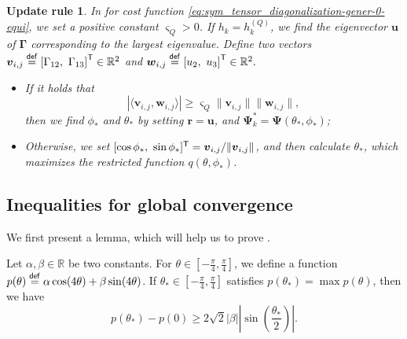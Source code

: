 \documentclass[final,onefignum,onetabnum]{siamart190516}
\newcommand{\matr}[1]{\boldsymbol{#1}}
\newcommand{\vect}[1]{\boldsymbol{#1}}
\newcommand{\T}{{\sf T}} %
\newcommand{\eqdef}{\stackrel{\sf def}{=}}
\newcommand{\RR}{\mathbb{R}}
\newcommand{\Utwo}{\Psi}
\newtheorem{setting}[theorem]{Update rule}
\begin{document}
\begin{setting}\label{remark:condition_inner}
In  for cost function \cref{eq:sym_tensor_diagonalization-gener-0-equi},
we set a positive constant $\varsigma_{Q}>0$. 
If $h_k=h^{(Q)}_k$,
we find the eigenvector $\vect{u}$ of $\matr{\Gamma}$ corresponding to the largest eigenvalue. 
Define two vectors  
$\vect{v}_{i,j}\eqdef\left[\Gamma_{12},\ \Gamma_{13}\right]^\T\in\RR^2$
and $\vect{w}_{i,j}\eqdef
\left[u_2,\ u_3\right]^\T\in\RR^2.$
\begin{itemize}
\item If it holds that 
\begin{equation}\label{eq:condition_phi_1}
|\langle\vect{v}_{i,j},\vect{w}_{i,j}\rangle|
\geq\varsigma_{Q}\|\vect{v}_{i,j}\|\|\vect{w}_{i,j}\|,
\end{equation}
then we find $\phi_*$ and $\theta_*$ by setting $\vect{r}=\vect{u}$, and $\matr{\Utwo}^{*}_{k}=\matr{\Utwo}(\theta_*,\phi_*)$;
\item Otherwise, we set $[\cos\phi_*,\ \sin\phi_*]^\T=\vect{v}_{i,j}/{\|\vect{v}_{i,j}\|}$, and then calculate $\theta_*$, which maximizes the restricted function $q(\theta,\phi_{*})$. 
\end{itemize}
\end{setting}


\subsection{Inequalities for global convergence}\label{subsec:condi_glob}

We first present a lemma, which will help us to prove .

\begin{lemma}\label{lemm:g-theta}
Let $\alpha,\beta\in\RR$ be two constants. 
For $\theta\in[-\frac{\pi}{4},\frac{\pi}{4}]$, we define a function $p(\theta)\eqdef \alpha\cos(4\theta) + \beta\sin(4\theta)$. 
If $\theta_{*}\in[-\frac{\pi}{4},\frac{\pi}{4}]$ satisfies $p(\theta_{*})=\max p(\theta)$, then we have 
\begin{equation*}
p(\theta_{*})-p(0)\geq 2\sqrt{2}|\beta|\left|\sin(\frac{\theta_*}{2})\right|.
\end{equation*} 
\end{lemma}
\end{document}
